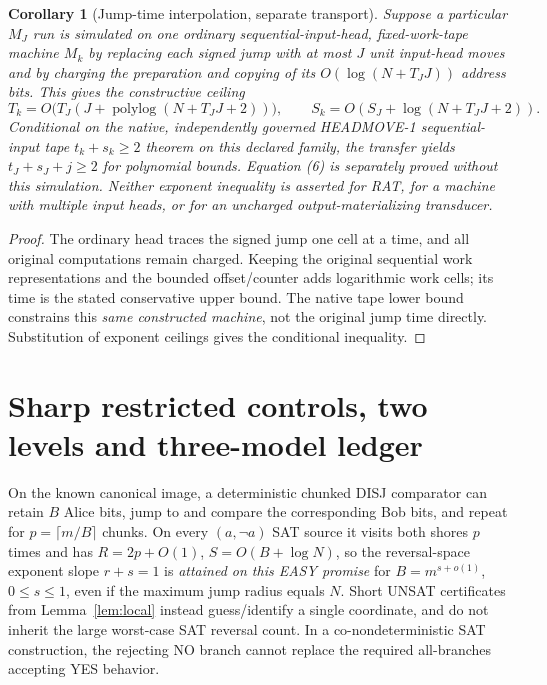 \documentclass[11pt]{article}
\newtheorem{corollary}[theorem]{Corollary}
\begin{document}
\begin{corollary}[Jump-time interpolation, separate transport]\label{cor:jump}
Suppose a particular $M_J$ run is simulated on one ordinary sequential-input-head, fixed-work-tape machine $M_k$ by replacing each signed jump with at most $J$ unit input-head moves and by charging the preparation and copying of its $O(\log(N+T_JJ))$ address bits. This gives the constructive ceiling
\[
 T_k=O\bigl(T_J(J+\operatorname{polylog}(N+T_JJ+2))\bigr),\qquad
 S_k=O(S_J+\log(N+T_JJ+2)).\tag{8}
\]
\emph{Conditional on} the native, independently governed HEADMOVE-1 sequential-input tape $t_k+s_k\ge2$ theorem on this declared family, the transfer yields $t_J+s_J+j\ge2$ for polynomial bounds. Equation (6) is separately proved \emph{without} this simulation. Neither exponent inequality is asserted for RAT, for a machine with multiple input heads, or for an uncharged output-materializing transducer.
\end{corollary}

\begin{proof}
The ordinary head traces the signed jump one cell at a time, and all original computations remain charged. Keeping the original sequential work representations and the bounded offset/counter adds logarithmic work cells; its time is the stated conservative upper bound. The native tape lower bound constrains this \emph{same constructed machine}, not the original jump time directly. Substitution of exponent ceilings gives the conditional inequality.\end{proof}

\section{Sharp restricted controls, two levels and three-model ledger}
On the known canonical image, a deterministic chunked DISJ comparator can retain $B$ Alice bits, jump to and compare the corresponding Bob bits, and repeat for $p=\lceil m/B\rceil$ chunks. On every $(a,\neg a)$ SAT source it visits both shores $p$ times and has $R=2p+O(1)$, $S=O(B+\log N)$, so the reversal-space exponent slope $r+s=1$ is \emph{attained on this EASY promise} for $B=m^{s+o(1)}$, $0\le s\le1$, even if the maximum jump radius equals $N$. Short UNSAT certificates from Lemma~\ref{lem:local} instead guess/identify a single coordinate, and do not inherit the large worst-case SAT reversal count. In a co-nondeterministic SAT construction, the rejecting NO branch cannot replace the required all-branches accepting YES behavior.
\end{document}
